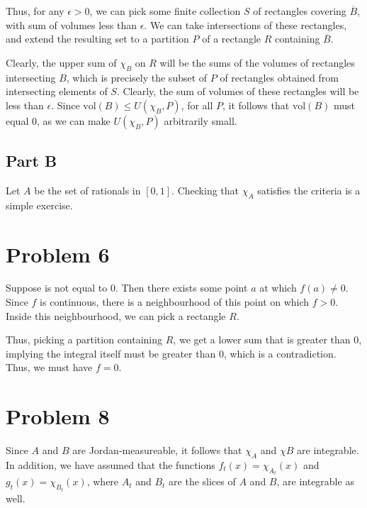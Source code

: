 \documentclass[10pt, oneside]{amsart}
\begin{document}
    Thus, for any $\epsilon > 0$, we can pick some finite collection $S$ of rectangles covering $\overline{B}$, with sum of volumes less than $\epsilon$. We can take intersections of these rectangles, and extend the resulting set
    to a partition $P$ of a rectangle $R$ containing $\overline{B}$.
    \newline

    Clearly, the upper sum of $\chi_B$ on $R$ will be the sums of the volumes of rectangles intersecting $B$, which is precisely the subset of $P$ of rectangles obtained from intersecting elements of $S$. Clearly, the sum
    of volumes of these rectangles will be less than $\epsilon$. Since $\text{vol}(B) \leq U(\chi_B, P)$, for all $P$, it follows that $\text{vol}(B)$ must equal $0$, as we can make $U(\chi_B, P)$ arbitrarily small.

    \subsection{Part B} Let $A$ be the set of rationals in $[0, 1]$. Checking that $\chi_A$ satisfies the criteria is a simple exercise.

    \hrulefill

    \section{Problem 6}

    Suppose is not equal to $0$. Then there exists some point $a$ at which $f(a) \neq 0$. Since $f$ is continuous, there is a neighbourhood of this point on which $f > 0$. Inside this neighbourhood,
    we can pick a rectangle $R$.
    \newline

    Thus, picking a partition containing $R$, we get a lower sum that is greater than $0$, implying the integral itself must be greater than $0$, which is a contradiction. Thus, we must have $f = 0$.

    \hrulefill

    \section{Problem 8}

    \hrulefill

    Since $A$ and $B$ are Jordan-measureable, it follows that $\chi_{A}$ and $\chi{B}$ are integrable. In addition, we have assumed that the functions $f_t(x) = \chi_{A_t}(x)$ and $g_t(x) = \chi_{B_t}(x)$,
    where $A_t$ and $B_t$ are the slices of $A$ and $B$, are integrable as well.
    \newline
\end{document}
